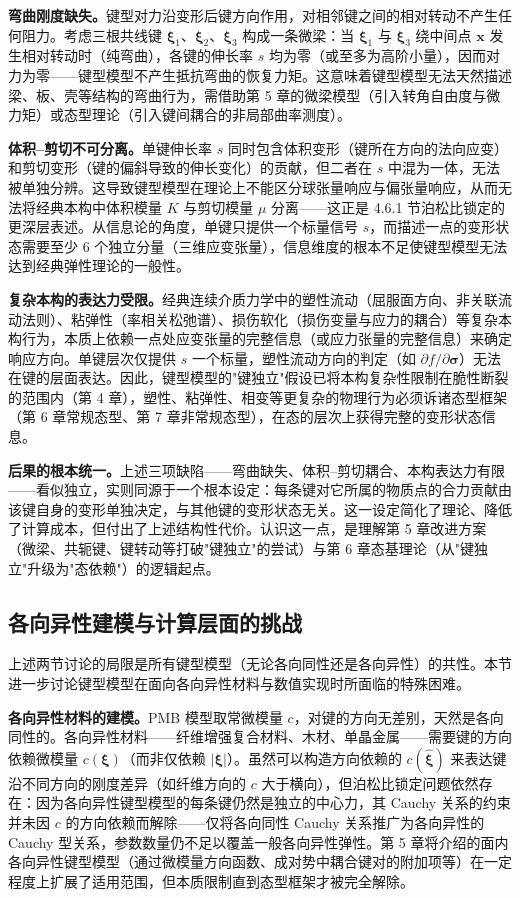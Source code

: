 \textbf{弯曲刚度缺失。}键型对力沿变形后键方向作用，对相邻键之间的相对转动不产生任何阻力。考虑三根共线键 $\boldsymbol{\xi}_{1}$、$\boldsymbol{\xi}_{2}$、$\boldsymbol{\xi}_{3}$ 构成一条微梁：当 $\boldsymbol{\xi}_{1}$ 与 $\boldsymbol{\xi}_{3}$ 绕中间点 $\mathbf{x}$ 发生相对转动时（纯弯曲），各键的伸长率 $s$ 均为零（或至多为高阶小量），因而对力为零——键型模型不产生抵抗弯曲的恢复力矩。这意味着键型模型无法天然描述梁、板、壳等结构的弯曲行为，需借助第 5 章的微梁模型（引入转角自由度与微力矩）或态型理论（引入键间耦合的非局部曲率测度）。

\textbf{体积--剪切不可分离。}单键伸长率 $s$ 同时包含体积变形（键所在方向的法向应变）和剪切变形（键的偏斜导致的伸长变化）的贡献，但二者在 $s$ 中混为一体，无法被单独分辨。这导致键型模型在理论上不能区分球张量响应与偏张量响应，从而无法将经典本构中体积模量 $K$ 与剪切模量 $\mu$ 分离——这正是 4.6.1 节泊松比锁定的更深层表述。从信息论的角度，单键只提供一个标量信号 $s$，而描述一点的变形状态需要至少 6 个独立分量（三维应变张量），信息维度的根本不足使键型模型无法达到经典弹性理论的一般性。

\textbf{复杂本构的表达力受限。}经典连续介质力学中的塑性流动（屈服面方向、非关联流动法则）、粘弹性（率相关松弛谱）、损伤软化（损伤变量与应力的耦合）等复杂本构行为，本质上依赖一点处应变张量的完整信息（或应力张量的完整信息）来确定响应方向。单键层次仅提供 $s$ 一个标量，塑性流动方向的判定（如 $\partial f/\partial\boldsymbol{\sigma}$）无法在键的层面表达。因此，键型模型的"键独立"假设已将本构复杂性限制在脆性断裂的范围内（第 4 章），塑性、粘弹性、相变等更复杂的物理行为必须诉诸态型框架（第 6 章常规态型、第 7 章非常规态型），在态的层次上获得完整的变形状态信息。

\textbf{后果的根本统一。}上述三项缺陷——弯曲缺失、体积--剪切耦合、本构表达力有限——看似独立，实则同源于一个根本设定：每条键对它所属的物质点的合力贡献由该键自身的变形单独决定，与其他键的变形状态无关。这一设定简化了理论、降低了计算成本，但付出了上述结构性代价。认识这一点，是理解第 5 章改进方案（微梁、共轭键、键转动等打破"键独立"的尝试）与第 6 章态基理论（从"键独立"升级为"态依赖"）的逻辑起点。

\subsection{各向异性建模与计算层面的挑战}

上述两节讨论的局限是所有键型模型（无论各向同性还是各向异性）的共性。本节进一步讨论键型模型在面向各向异性材料与数值实现时所面临的特殊困难。

\textbf{各向异性材料的建模。}PMB 模型取常微模量 $c$，对键的方向无差别，天然是各向同性的。各向异性材料——纤维增强复合材料、木材、单晶金属——需要键的方向依赖微模量 $c(\boldsymbol{\xi})$（而非仅依赖 $|\boldsymbol{\xi}|$）。虽然可以构造方向依赖的 $c(\hat{\boldsymbol{\xi}})$ 来表达键沿不同方向的刚度差异（如纤维方向的 $c$ 大于横向），但泊松比锁定问题依然存在：因为各向异性键型模型的每条键仍然是独立的中心力，其 Cauchy 关系的约束并未因 $c$ 的方向依赖而解除——仅将各向同性 Cauchy 关系推广为各向异性的 Cauchy 型关系，参数数量仍不足以覆盖一般各向异性弹性。第 5 章将介绍的面内各向异性键型模型（通过微模量方向函数、成对势中耦合键对的附加项等）在一定程度上扩展了适用范围，但本质限制直到态型框架才被完全解除。

